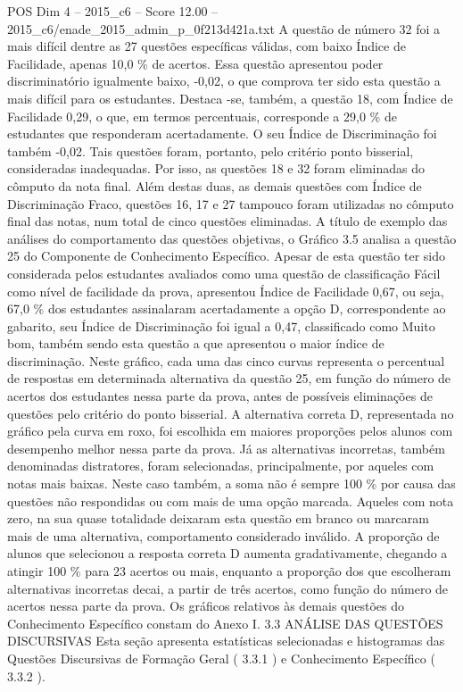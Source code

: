 \begin{textsample}{POS Dim 4 – 2015\_c6 – Score 12.00 – 2015\_c6/enade\_2015\_admin\_p\_0f213d421a.txt}
A questão de número 32 foi a mais difícil dentre as 27 questões específicas válidas, com baixo Índice de Facilidade, apenas 10,0 \% de acertos.
Essa questão apresentou poder discriminatório igualmente baixo, -0,02, o que comprova ter sido esta questão a mais difícil para os estudantes.
Destaca -se, também, a questão 18, com Índice de Facilidade 0,29, o que, em termos percentuais, corresponde a 29,0 \% de estudantes que responderam acertadamente.
O seu Índice de Discriminação foi também -0,02.
Tais questões foram, portanto, pelo critério ponto bisserial, consideradas inadequadas.
Por isso, as questões 18 e 32 foram eliminadas do cômputo da nota final.
Além destas duas, as demais questões com Índice de Discriminação Fraco, questões 16, 17 e 27 tampouco foram utilizadas no cômputo final das notas, num total de cinco questões eliminadas.
A título de exemplo das análises do comportamento das questões objetivas, o Gráfico 3.5 analisa a questão 25 do Componente de Conhecimento Específico.
Apesar de esta questão ter sido considerada pelos estudantes avaliados como uma questão de classificação Fácil como nível de facilidade da prova, apresentou Índice de Facilidade 0,67, ou seja, 67,0 \% dos estudantes assinalaram acertadamente a opção D, correspondente ao gabarito, seu Índice de Discriminação foi igual a 0,47, classificado como Muito bom, também sendo esta questão a que apresentou o maior índice de discriminação.
Neste gráfico, cada uma das cinco curvas representa o percentual de respostas em determinada alternativa da questão 25, em função do número de acertos dos estudantes nessa parte da prova, antes de possíveis eliminações de questões pelo critério do ponto bisserial.
A alternativa correta D, representada no gráfico pela curva em roxo, foi escolhida em maiores proporções pelos alunos com desempenho melhor nessa parte da prova.
Já as alternativas incorretas, também denominadas distratores, foram selecionadas, principalmente, por aqueles com notas mais baixas.
Neste caso também, a soma não é sempre 100 \% por causa das questões não respondidas ou com mais de uma opção marcada.
Aqueles com nota zero, na sua quase totalidade deixaram esta questão em branco ou marcaram mais de uma alternativa, comportamento considerado inválido.
A proporção de alunos que selecionou a resposta correta D aumenta gradativamente, chegando a atingir 100 \% para 23 acertos ou mais, enquanto a proporção dos que escolheram alternativas incorretas decai, a partir de três acertos, como função do número de acertos nessa parte da prova.
Os gráficos relativos às demais questões do Conhecimento Específico constam do Anexo I. 3.3 ANÁLISE DAS QUESTÕES DISCURSIVAS Esta seção apresenta estatísticas selecionadas e histogramas das Questões Discursivas de Formação Geral ( 3.3.1 ) e Conhecimento Específico ( 3.3.2 ).

\end{textsample}
